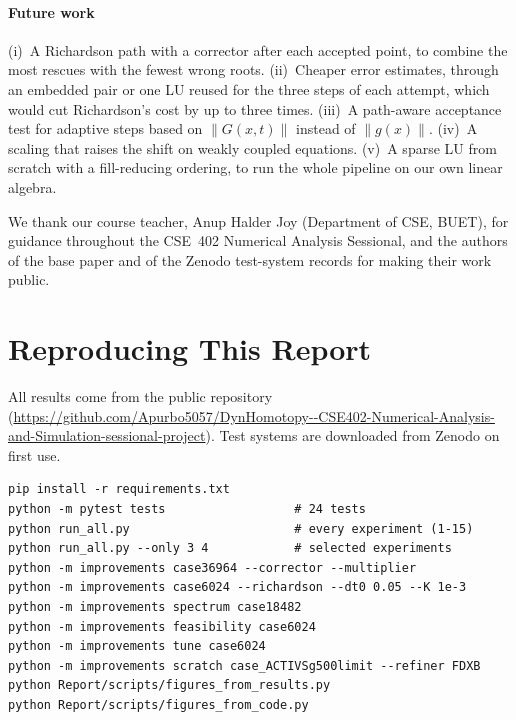 \documentclass[sigconf,nonacm]{acmart}
\newcommand{\norm}[1]{\lVert #1\rVert}
\newcommand{\repo}{\url{https://github.com/Apurbo5057/DynHomotopy--CSE402-Numerical-Analysis-and-Simulation-sessional-project}}
\begin{document}
\paragraph{Future work} (i)~A Richardson path with a corrector after each accepted point, to combine the
most rescues with the fewest wrong roots. (ii)~Cheaper error estimates, through an embedded pair or one LU
reused for the three steps of each attempt, which would cut Richardson's cost by up to three times. (iii)~A
path-aware acceptance test for adaptive steps based on $\norm{G(x,t)}$ instead of $\norm{g(x)}$. (iv)~A scaling
that raises the shift on weakly coupled equations. (v)~A sparse LU from scratch with a fill-reducing ordering,
to run the whole pipeline on our own linear algebra.

\begin{acks}
We thank our course teacher, Anup Halder Joy (Department of CSE, BUET), for guidance throughout the CSE~402
Numerical Analysis Sessional, and the authors of the base paper and of the Zenodo test-system records for
making their work public.
\end{acks}




\clearpage
\onecolumn
\appendix
\section{Reproducing This Report}\label{app:repro}
All results come from the public repository~\cite{ourrepo} (\repo). Test systems are downloaded from Zenodo
on first use.
\begin{lstlisting}[style=sh]
pip install -r requirements.txt
python -m pytest tests                  # 24 tests
python run_all.py                       # every experiment (1-15)
python run_all.py --only 3 4            # selected experiments
python -m improvements case36964 --corrector --multiplier
python -m improvements case6024 --richardson --dt0 0.05 --K 1e-3
python -m improvements spectrum case18482
python -m improvements feasibility case6024
python -m improvements tune case6024
python -m improvements scratch case_ACTIVSg500limit --refiner FDXB
python Report/scripts/figures_from_results.py
python Report/scripts/figures_from_code.py
\end{lstlisting}
\end{document}
